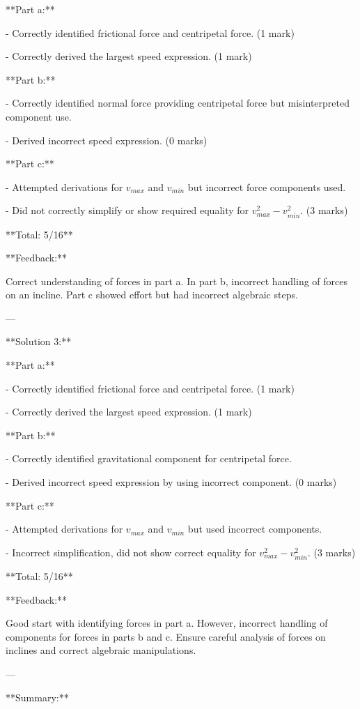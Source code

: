 \documentclass[a4paper,11pt]{article}
\begin{document}
**Part a:**

- Correctly identified frictional force and centripetal force. (1 mark)

- Correctly derived the largest speed expression. (1 mark)

**Part b:**

- Correctly identified normal force providing centripetal force but misinterpreted component use.

- Derived incorrect speed expression. (0 marks)

**Part c:**

- Attempted derivations for \(v_{max}\) and \(v_{min}\) but incorrect force components used.

- Did not correctly simplify or show required equality for \(v_{max}^2 - v_{min}^2\). (3 marks)

**Total: 5/16**

**Feedback:**

Correct understanding of forces in part a. In part b, incorrect handling of forces on an incline. Part c showed effort but had incorrect algebraic steps.

---

**Solution 3:**

**Part a:**

- Correctly identified frictional force and centripetal force. (1 mark)

- Correctly derived the largest speed expression. (1 mark)

**Part b:**

- Correctly identified gravitational component for centripetal force.

- Derived incorrect speed expression by using incorrect component. (0 marks)

**Part c:**

- Attempted derivations for \(v_{max}\) and \(v_{min}\) but used incorrect components.

- Incorrect simplification, did not show correct equality for \(v_{max}^2 - v_{min}^2\). (3 marks)

**Total: 5/16**

**Feedback:**

Good start with identifying forces in part a. However, incorrect handling of components for forces in parts b and c. Ensure careful analysis of forces on inclines and correct algebraic manipulations.

---

**Summary:**
\end{document}
